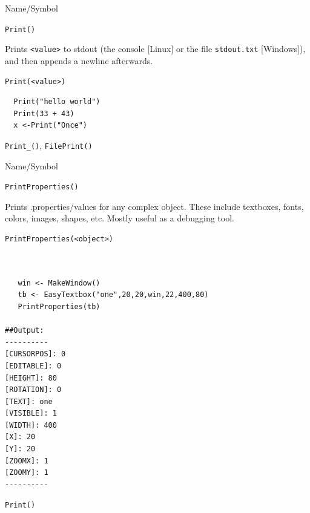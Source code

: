 \begin{desc}{Name/Symbol}
\item[Name/Symbol]	\verb+Print()+

\item[Description]	Prints \verb+<value>+ to stdout (the console [Linux] or the file \texttt{stdout.txt} [Windows]), and then appends a newline afterwards.

\item[Usage]		
\begin{verbatim}
Print(<value>)
\end{verbatim}

\item[Example]	
\begin{verbatim}
  Print("hello world")
  Print(33 + 43)
  x <-Print("Once")

\end{verbatim}
\item[See Also]	\verb+Print_()+, \verb+FilePrint()+
\end{desc}
\begin{desc}{Name/Symbol}
\item[Name/Symbol]	\verb+PrintProperties()+

\item[Description]	Prints .properties/values for any complex object.
  These include textboxes, fonts, colors, images, shapes, etc. Mostly
  useful as a debugging tool.

\item[Usage]		
\begin{verbatim}
PrintProperties(<object>)
\end{verbatim}

\item[Example]	
\begin{verbatim}


   win <- MakeWindow()
   tb <- EasyTextbox("one",20,20,win,22,400,80)
   PrintProperties(tb)

##Output:
----------
[CURSORPOS]: 0
[EDITABLE]: 0
[HEIGHT]: 80
[ROTATION]: 0
[TEXT]: one
[VISIBLE]: 1
[WIDTH]: 400
[X]: 20
[Y]: 20
[ZOOMX]: 1
[ZOOMY]: 1
----------

\end{verbatim}
\item[See Also]	\verb+Print()+
\end{desc}


